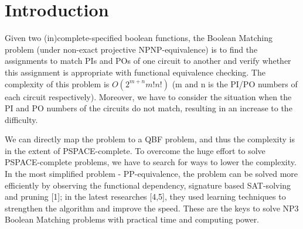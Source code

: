 \section{Introduction}
Given two (in)complete-specified boolean functions, the Boolean Matching problem (under non-exact projective NPNP-equivalence) is to find the assignments to match PIs and POs of one circuit to another and verify whether this assignment is appropriate with functional equivalence checking. The complexity of this problem is $O(2^{m+n}m!n!)$ (m and n is the PI/PO numbers of each circuit respectively). Moreover, we have to consider the situation when the PI and PO numbers of the circuits do not match, resulting in an increase to the difficulty. 

We can directly map the problem to a QBF problem, and thus the complexity is in the extent of PSPACE-complete. To overcome the huge effort to solve PSPACE-complete problems, we have to search for ways to lower the complexity. In the most simplified problem - PP-equivalence, the problem can be solved more efficiently by observing the functional dependency, signature based SAT-solving and pruning [1]; in the latest researches [4,5], they used learning techniques to strengthen the algorithm and improve the speed. These are the keys to solve NP3 Boolean Matching problems with practical time and computing power.


%
%

